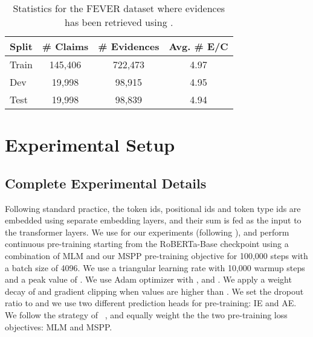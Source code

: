\begin{itemize}[wide, labelwidth=!, labelindent=0pt]
    \begin{table}[h]
    \centering
    \small
    \begin{tabular}{lccc}
    \toprule
        \textbf{Split} & \textbf{\# Claims} & \textbf{\# Evidences} & \textbf{Avg. \# E/C} \\
        \midrule
        Train   & 145,406    & 722,473 & 4.97 \\
        Dev     & 19,998     & 98,915  & 4.95 \\
        Test    & 19,998     & 98,839  & 4.94 \\ \bottomrule
    \end{tabular}
    \caption{Statistics for the FEVER dataset where evidences has been retrieved using \citep{liu2020kernel}.}
    \label{tab:fever}
    \end{table}    
\end{itemize}



\section{Experimental Setup}
\label{app:experiments}

\subsection{Complete Experimental Details}
Following standard practice, the token ids, positional ids and token type ids are embedded using separate embedding layers, and their sum is fed as the input to the transformer layers.
We use  for our experiments (following \citeauthor{zhang-etal-2021-joint, tymoshenko-moschitti-2021-strong}), and perform continuous pre-training starting from the RoBERTa-Base checkpoint using a combination of MLM and our MSPP pre-training objective for 100,000 steps with a batch size of 4096. We use a triangular learning rate with 10,000 warmup steps and a peak value of . We use Adam optimizer with ,  and . We apply a weight decay of  and gradient clipping when values are higher than . We set the dropout ratio to  and we use two different prediction heads for pre-training: IE and AE. We follow the strategy of ~\cite{devlin2019bert,lan2020albert}, and equally weight the the two pre-training loss objectives: MLM and MSPP.

